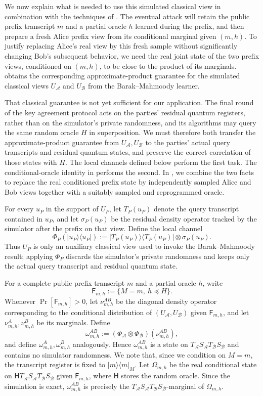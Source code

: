 \documentclass[11pt]{article}
\newcounter{algorithm}
\newcommand{\cA}{\mathcal{A}}
\newcommand{\cB}{\mathcal{B}}
\newcommand{\ket}[1]{\lvert #1\rangle}
\newcommand{\bra}[1]{\langle #1\rvert}
\newcommand{\proj}[1]{\ket{#1}\!\bra{#1}}
\begin{document}
We now explain what is needed to use this simulated classical view in combination with the techniques of \cite{BarakMahmoodyFull}. The eventual attack will retain the public prefix transcript $m$ and a
partial oracle $h$ learned during the prefix, and then prepare a fresh Alice
prefix view from its conditional marginal given $(m,h)$.  To justify replacing
Alice's real view by this fresh sample without significantly changing Bob's
subsequent behavior, we need the real joint state of the two prefix views,
conditioned on $(m,h)$, to be close to the product of its marginals.
 obtains the corresponding approximate-product
guarantee for the simulated classical views $U_{\cA}$ and $U_{\cB}$ from
the Barak--Mahmoody learner.

That classical guarantee is not yet sufficient for our application.  The
final round of the key agreement protocol acts on the parties' residual quantum registers, rather than on the
simulator's private randomness, and its algorithms may query the same random
oracle $H$ in superposition.  We must therefore both transfer the
approximate-product guarantee from $U_{\cA},U_{\cB}$ to the parties' actual
query transcripts and residual quantum states, and preserve the correct
correlation of those states with $H$.  The local channels defined below
perform the first task.  The conditional-oracle identity in
 performs the second.  In
, we combine the two facts to replace
the real conditioned prefix state by independently sampled Alice and Bob
views together with a suitably sampled and reprogrammed oracle.

For every $u_P$ in the support of $U_P$, let $T_P(u_P)$ denote the query
transcript contained in $u_P$, and let $\sigma_P(u_P)$ be the residual density
operator tracked by the simulator after the prefix on that view.  Define the
local channel
\[
  \Phi_P(\proj{u_P})
  :=
  \proj{T_P(u_P)}\otimes\sigma_P(u_P).
\]
Thus $U_P$ is only an auxiliary classical view used to invoke the
Barak--Mahmoody result; applying $\Phi_P$ discards the simulator's private
randomness and keeps only the actual query transcript and residual quantum
state.

For a complete public prefix transcript $m$ and a partial oracle $h$, write
\[
  \mathsf F_{m,h}:=\{M=m,\ h\preceq H\}.
\]
Whenever $\Pr[\mathsf F_{m,h}]>0$, let $\nu^{AB}_{m,h}$ be the diagonal density
operator corresponding to the conditional distribution of
$(U_{\cA},U_{\cB})$ given $\mathsf F_{m,h}$, and let
$\nu^A_{m,h},\nu^B_{m,h}$ be its marginals.  Define
\[
  \omega^{AB}_{m,h}
  :=
  (\Phi_{\cA}\otimes\Phi_{\cB})(\nu^{AB}_{m,h}),
\]
and define $\omega^A_{m,h},\omega^B_{m,h}$ analogously.  Hence
$\omega^{AB}_{m,h}$ is a state on
$T_{\cA}S_{\cA}T_{\cB}S_{\cB}$ and contains no simulator randomness.
We note that, since we condition on $M=m$, the transcript register is fixed to
$\proj{m}_M$.  Let
$\Omega_{m,h}$ be the real
conditional state on
$\mathsf H T_{\cA}S_{\cA}T_{\cB}S_{\cB}$ given $\mathsf F_{m,h}$, where
$\mathsf H$ stores the random oracle.  Since the simulation is exact,
$\omega^{AB}_{m,h}$ is precisely the
$T_{\cA}S_{\cA}T_{\cB}S_{\cB}$-marginal of $\Omega_{m,h}$.
\end{document}
